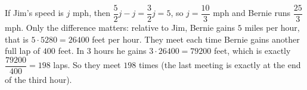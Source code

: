 If Jim's speed is $j$ mph, then $\dfrac{5}{2}j-j=\dfrac{3}{2}j=5$, so $j=\dfrac{10}{3}$ mph and Bernie runs $\dfrac{25}{3}$ mph. Only the difference matters: relative to Jim, Bernie gains $5$ miles per hour, that is $5\cdot5280=26400$ feet per hour. They meet each time Bernie gains another full lap of $400$ feet. In $3$ hours he gains $3\cdot26400=79200$ feet, which is exactly $\dfrac{79200}{400}=198$ laps. So they meet $\boxed{198}$ times (the last meeting is exactly at the end of the third hour).
